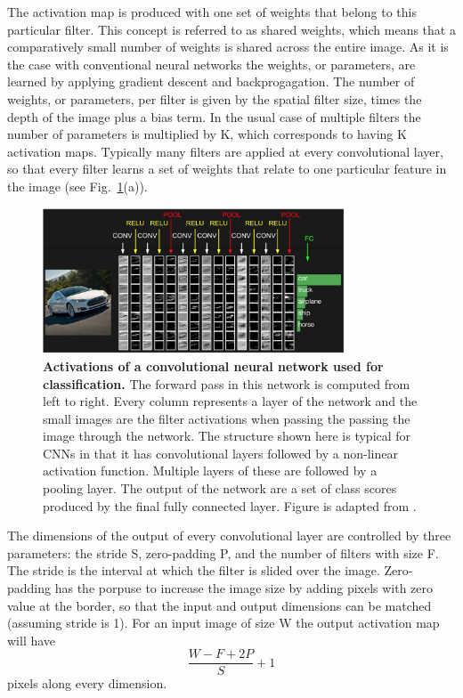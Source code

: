 The activation map is produced with one set of weights that belong to this particular filter. This concept is referred to as shared weights, which means that a comparatively small number of weights is shared across the entire image. As it is the case with conventional neural networks the weights, or parameters, are learned by applying gradient descent and backprogagation.  The number of weights, or parameters, per filter is given by the spatial filter size, times the depth of the image plus a bias term. In the usual case of multiple filters the number of parameters is multiplied by K, which corresponds to having K activation maps. Typically many filters are applied at every convolutional layer, so that every filter learns a set of weights that relate to one particular feature in the image (see Fig.~\ref{fig:convnet}(a)). 


\begin{figure}[h!]
	\centering
	\captionsetup{width=1\linewidth}
	\includegraphics[width=0.8\textwidth]{Figures/convnet.png}
	\caption{\textbf{Activations of a convolutional neural network used for classification.} The forward pass in this network is computed from left to right. Every column represents a layer of the network and the small images are the filter activations when passing the passing the image through the network. The structure shown here is typical for CNNs in that it has convolutional layers followed by a non-linear activation function. Multiple layers of these are followed by a pooling layer. The output of the network are a set of class scores produced by the final fully connected layer. Figure is adapted from \parencite{cs231_convnets}.}
	\label{fig:convnet}
\end{figure}

The dimensions of the output of every convolutional layer are controlled by three parameters: the stride S, zero-padding P, and the number of filters with size F. The stride is the interval at which the filter is slided over the image. Zero-padding has the porpuse to increase the image size by adding pixels with zero value at the border, so that the input and output dimensions can be matched (assuming stride is 1). For an input image of size W the output activation map will have
\begin{equation}
\frac{W - F +2P}{S} + 1
\end{equation}
pixels along every dimension. 

